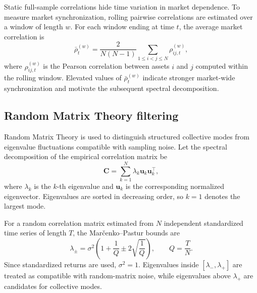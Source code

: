 Static full-sample correlations hide time variation in market dependence. To measure market synchronization, rolling pairwise correlations are estimated over a window of length $w$. For each window ending at time $t$, the average market correlation is
\begin{equation}
\bar{\rho}_t^{(w)}
=
\frac{2}{N(N-1)}
\sum_{1\leq i<j\leq N}
\rho_{ij,t}^{(w)},
\end{equation}
where $\rho_{ij,t}^{(w)}$ is the Pearson correlation between assets $i$ and $j$ computed within the rolling window. Elevated values of $\bar{\rho}_t^{(w)}$ indicate stronger market-wide synchronization and motivate the subsequent spectral decomposition.

\subsection{Random Matrix Theory filtering}
\label{subsec:rmt_method}

Random Matrix Theory is used to distinguish structured collective modes from eigenvalue fluctuations compatible with sampling noise. Let the spectral decomposition of the empirical correlation matrix be
\begin{equation}
\mathbf{C}
=
\sum_{k=1}^{N}
\lambda_k
\mathbf{u}_k
\mathbf{u}_k^{\top},
\end{equation}
where $\lambda_k$ is the $k$-th eigenvalue and $\mathbf{u}_k$ is the corresponding normalized eigenvector. Eigenvalues are sorted in decreasing order, so $k=1$ denotes the largest mode.

For a random correlation matrix estimated from $N$ independent standardized time series of length $T$, the Mar\v{c}enko--Pastur bounds are
\begin{equation}
\lambda_{\pm}
=
\sigma^2
\left(
1+\frac{1}{Q}
\pm
2\sqrt{\frac{1}{Q}}
\right),
\qquad
Q=\frac{T}{N}.
\end{equation}
Since standardized returns are used, $\sigma^2=1$. Eigenvalues inside $[\lambda_-,\lambda_+]$ are treated as compatible with random-matrix noise, while eigenvalues above $\lambda_+$ are candidates for collective modes.

